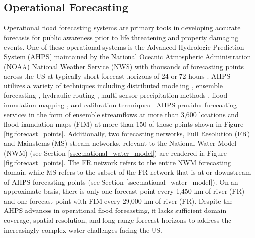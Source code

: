 \documentclass[draft]{dependencies/agujournal2019}
\begin{document}
\subsection{Operational Forecasting}
%
Operational flood forecasting systems are primary tools in developing accurate forecasts for public awareness prior to life threatening and property damaging events. 
One of these operational systems is the Advanced Hydrologic Prediction System (AHPS) maintained by the National Oceanic Atmospheric Administration (NOAA) National Weather Service (NWS) with thousands of forecasting points across the US at typically short forecast horizons of 24 or 72 hours \cite{mcenery2005noaa}.
AHPS utilizes a variety of techniques including distributed modeling \cite{reed2004overall,koren2004hydrology,duan2003global}, ensemble forecasting \cite{day1985extended,seo2000simulation,mullusky2002simplified,herr2002simplified}, hydraulic routing \cite{cajina2002fldview,fread1973technique}, multi-sensor precipitation methods \cite{seo2002real,kondragunta2001outlier,breidenbach1999accounting,bonnin1996noaa}, flood inundation mapping \cite{cajina2002fldview}, and calibration techniques \cite{zhang2003hydrologic,hogue2003multi,duan2003global,gupta2003advances,parada2003multi}.
AHPS provides forecasting services in the form of ensemble streamflows at more than 3,600 locations and flood inundation maps (FIM) at more than 150 of those points shown in Figure \ref{fig:forecast_points}.
Additionally, two forecasting networks, Full Resolution (FR) and Mainstems (MS) stream networks, relevant to the National Water Model (NWM) (see Section \ref{ssec:national_water_model}) are rendered in Figure \ref{fig:forecast_points}.
The FR network refers to the entire NWM forecasting domain while MS refers to the subset of the FR network that is at or downstream of AHPS forecasting points (see Section \ref{ssec:national_water_model}).
On an approximate basis, there is only one forecast point every 1,450 km of river (FR) and one forecast point with FIM every 29,000 km of river (FR).
Despite the AHPS advances in operational flood forecasting, it lacks sufficient domain coverage, spatial resolution, and long-range forecast horizons to address the increasingly complex water challenges facing the US.
%
\end{document}
